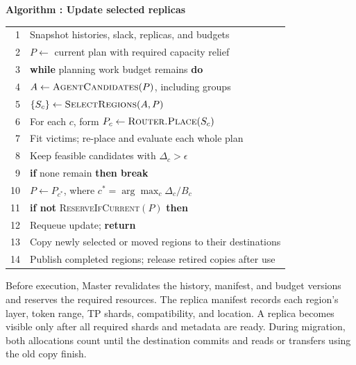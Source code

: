 \par\medskip\noindent\begin{minipage}{\columnwidth}
\raggedright
{}\label{alg:protection}
\textbf{Algorithm \thedesignalgorithm: Update selected replicas}
\par\smallskip
\begin{tabularx}{\columnwidth}{@{}r@{\quad}X@{}}
\toprule
1 & Snapshot histories, slack, replicas, and budgets \\
2 & $P\gets$ current plan with required capacity relief \\
3 & \textbf{while} planning work budget remains \textbf{do} \\
4 & \quad $A\gets\textsc{AgentCandidates}(P)$, including groups \\
5 & \quad $\{S_c\}\gets\textsc{SelectRegions}(A,P)$ \\
6 & \quad For each $c$, form $P_c\gets\textsc{Router.Place}(S_c)$ \\
7 & \quad Fit victims; re-place and evaluate each whole plan \\
8 & \quad Keep feasible candidates with $\Delta_c>\epsilon$ \\
9 & \quad \textbf{if} none remain \textbf{then break} \\
10 & \quad $P\gets P_{c^*}$, where $c^*=\arg\max_c\Delta_c/B_c$ \\
11 & \textbf{if not} \textsc{ReserveIfCurrent}$(P)$ \textbf{then} \\
12 & \quad Requeue update; \textbf{return} \\
13 & Copy newly selected or moved regions to their destinations \\
14 & Publish completed regions; release retired copies after use \\
\bottomrule
\end{tabularx}
\end{minipage}\par\medskip

Before execution, Master revalidates the history, manifest, and budget
versions and reserves the required resources. The replica manifest
records each region's layer, token range, TP shards, compatibility, and
location. A replica becomes visible only after all required shards and
metadata are ready. During migration, both allocations count until the
destination commits and reads or transfers using the old copy finish.

